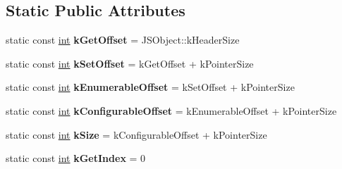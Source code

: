 \subsection*{Static Public Attributes}
\begin{DoxyCompactItemize}
\item 
\mbox{\label{classv8_1_1internal_1_1JSAccessorPropertyDescriptor_acc35936a81ef289e8802672dd99ad0a8}} 
static const \mbox{\hyperlink{classint}{int}} {\bfseries k\+Get\+Offset} = J\+S\+Object\+::k\+Header\+Size
\item 
\mbox{\label{classv8_1_1internal_1_1JSAccessorPropertyDescriptor_a3ccf2839f201d380a649b44a9b768cc8}} 
static const \mbox{\hyperlink{classint}{int}} {\bfseries k\+Set\+Offset} = k\+Get\+Offset + k\+Pointer\+Size
\item 
\mbox{\label{classv8_1_1internal_1_1JSAccessorPropertyDescriptor_a6d46a47185ab9ef0220ad93d878e65d1}} 
static const \mbox{\hyperlink{classint}{int}} {\bfseries k\+Enumerable\+Offset} = k\+Set\+Offset + k\+Pointer\+Size
\item 
\mbox{\label{classv8_1_1internal_1_1JSAccessorPropertyDescriptor_a9806e9203c48500eb99ad5bfca49e4fb}} 
static const \mbox{\hyperlink{classint}{int}} {\bfseries k\+Configurable\+Offset} = k\+Enumerable\+Offset + k\+Pointer\+Size
\item 
\mbox{\label{classv8_1_1internal_1_1JSAccessorPropertyDescriptor_a62f9633c69a802ef111bb13a3843daef}} 
static const \mbox{\hyperlink{classint}{int}} {\bfseries k\+Size} = k\+Configurable\+Offset + k\+Pointer\+Size
\item 
\mbox{\label{classv8_1_1internal_1_1JSAccessorPropertyDescriptor_aeae1aa548bee1c4181760ba59023cf75}} 
static const \mbox{\hyperlink{classint}{int}} {\bfseries k\+Get\+Index} = 0
\item 
\mbox{\label{classv8_1_1internal_1_1JSAccessorPropertyDescriptor_a1d2760756e8cfdb9de27aa094fbe52ab}} 

\end{DoxyCompactItemize}
